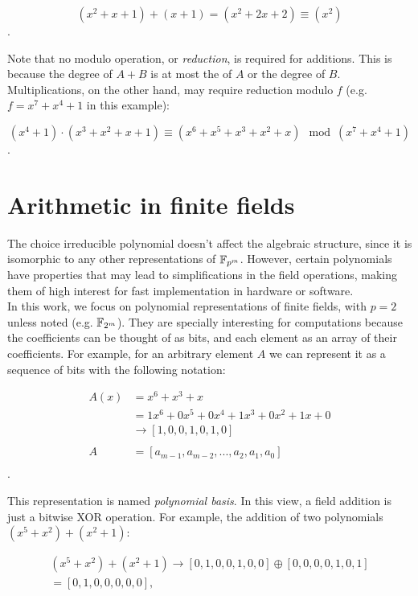 $$(x^2+x+1) + (x+1) = (x^2+2x+2) \equiv (x^2)$$.

Note that no modulo operation, or \emph{reduction}, is required for additions. This is because the degree of $A+B$ is at most the of $A$ or the degree of $B$. Multiplications, on the other hand, may require reduction modulo $f$ (e.g. $f=x^7+x^4+1$ in this example):

$$(x^4+1) \cdot (x^3+x^2+x+1) \equiv (x^6+x^5+x^3+x^2+x) \mod (x^7+x^4+1)$$.

\section{Arithmetic in finite fields} \label{background:arithmetic}

The choice irreducible polynomial doesn't affect the algebraic structure, since it is isomorphic to any other representations of $\mathbb{F}_{p^m}$. However, certain polynomials have properties that may lead to simplifications in the field operations, making them of high interest for fast implementation in hardware or software.\\

In this work, we focus on polynomial representations of finite fields, with $p=2$ unless noted (e.g. $\mathbb{F}_{2^m}$). They are specially interesting for computations because the coefficients can be thought of as bits, and each element as an array of their coefficients. For example, for an arbitrary element $A$ we can represent it as a sequence of bits with the following notation:

\begin{align*}
A(x) &= x^6+x^3+x \\
& = 1x^6+0x^5+0x^4+1x^3+0x^2+1x+0\\
& \rightarrow [1, 0, 0, 1, 0, 1, 0] \\
\\
A &= [a_{m-1}, a_{m-2}, ..., a_2, a_1, a_0] \\
\end{align*}.

This representation is named \emph{polynomial basis}. In this view, a field addition is just a bitwise XOR operation. For example, the addition of two polynomials $(x^5+x^2)+(x^2+1)$:

\begin{gather*}
(x^5+x^2)+(x^2+1) \rightarrow [0, 1, 0, 0, 1, 0, 0] \oplus [0, 0, 0, 0, 1, 0, 1] \\
= [0, 1, 0, 0, 0, 0, 0],
\end{gather*}

